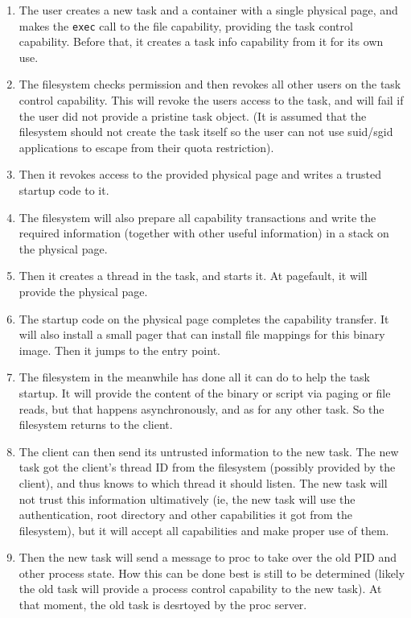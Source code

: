 \begin{enumerate}
\item The user creates a new task and a container with a single
  physical page, and makes the \texttt{exec} call to the file
  capability, providing the task control capability.  Before that, it
  creates a task info capability from it for its own use.
\item The filesystem checks permission and then revokes all other
  users on the task control capability.  This will revoke the users
  access to the task, and will fail if the user did not provide a
  pristine task object.  (It is assumed that the filesystem should not
  create the task itself so the user can not use suid/sgid
  applications to escape from their quota restriction).
\item Then it revokes access to the provided physical page and writes
  a trusted startup code to it.
\item The filesystem will also prepare all capability transactions and
  write the required information (together with other useful
  information) in a stack on the physical page.
\item Then it creates a thread in the task, and starts it.  At
  pagefault, it will provide the physical page.
\item The startup code on the physical page completes the capability
  transfer.  It will also install a small pager that can install file
  mappings for this binary image.  Then it jumps to the entry point.
\item The filesystem in the meanwhile has done all it can do to help
  the task startup.  It will provide the content of the binary or
  script via paging or file reads, but that happens asynchronously,
  and as for any other task.  So the filesystem returns to the client.
\item The client can then send its untrusted information to the new
  task.  The new task got the client's thread ID from the filesystem
  (possibly provided by the client), and thus knows to which thread it
  should listen.  The new task will not trust this information
  ultimatively (ie, the new task will use the authentication, root
  directory and other capabilities it got from the filesystem), but it
  will accept all capabilities and make proper use of them.
\item Then the new task will send a message to proc to take over the
  old PID and other process state.  How this can be done best is still
  to be determined (likely the old task will provide a process control
  capability to the new task).  At that moment, the old task is
  desrtoyed by the proc server.
\end{enumerate}

